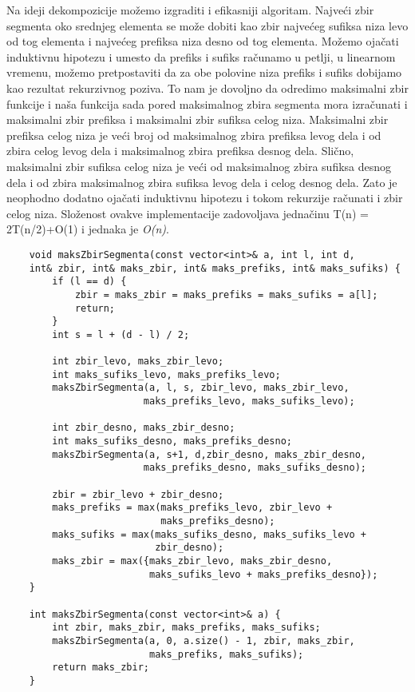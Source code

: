 \documentclass{article}
\begin{document}
Na ideji dekompozicije možemo izgraditi i efikasniji algoritam. Najveći zbir segmenta oko srednjeg elementa se može dobiti kao
zbir najvećeg sufiksa niza levo od tog elementa i najvećeg prefiksa niza desno
od tog elementa. Možemo ojačati induktivnu hipotezu i umesto da prefiks i
sufiks računamo u petlji, u linearnom vremenu, možemo pretpostaviti da za obe
polovine niza prefiks i sufiks dobijamo kao rezultat rekurzivnog poziva. To nam
je dovoljno da odredimo maksimalni zbir funkcije i naša
funkcija sada pored maksimalnog zbira segmenta mora izračunati i maksimalni
zbir prefiksa i maksimalni zbir sufiksa celog niza. Maksimalni zbir prefiksa
celog niza je veći broj od maksimalnog zbira prefiksa levog dela i od zbira celog
levog dela i maksimalnog zbira prefiksa desnog dela. Slično, maksimalni zbir
sufiksa celog niza je veći od maksimalnog zbira sufiksa desnog dela i od zbira
maksimalnog zbira sufiksa levog dela i celog desnog dela. Zato je neophodno
dodatno ojačati induktivnu hipotezu i tokom rekurzije računati i zbir celog niza. Složenost ovakve implementacije zadovoljava jednačinu 
T(n) = 2T(n/2)+O(1) i jednaka je \textit{O(n)}.
\begin{lstlisting}
    void maksZbirSegmenta(const vector<int>& a, int l, int d,
    int& zbir, int& maks_zbir, int& maks_prefiks, int& maks_sufiks) {
        if (l == d) {
            zbir = maks_zbir = maks_prefiks = maks_sufiks = a[l];
            return;
        }
        int s = l + (d - l) / 2;
       
        int zbir_levo, maks_zbir_levo; 
        int maks_sufiks_levo, maks_prefiks_levo;
        maksZbirSegmenta(a, l, s, zbir_levo, maks_zbir_levo,
                        maks_prefiks_levo, maks_sufiks_levo);
       
        int zbir_desno, maks_zbir_desno;
        int maks_sufiks_desno, maks_prefiks_desno;
        maksZbirSegmenta(a, s+1, d,zbir_desno, maks_zbir_desno,
                        maks_prefiks_desno, maks_sufiks_desno);
        
        zbir = zbir_levo + zbir_desno;
        maks_prefiks = max(maks_prefiks_levo, zbir_levo +             
                           maks_prefiks_desno);
        maks_sufiks = max(maks_sufiks_desno, maks_sufiks_levo + 
                          zbir_desno);
        maks_zbir = max({maks_zbir_levo, maks_zbir_desno, 
                         maks_sufiks_levo + maks_prefiks_desno});
    }
    
    int maksZbirSegmenta(const vector<int>& a) {
        int zbir, maks_zbir, maks_prefiks, maks_sufiks;
        maksZbirSegmenta(a, 0, a.size() - 1, zbir, maks_zbir, 
                         maks_prefiks, maks_sufiks);
        return maks_zbir;
    }
\end{lstlisting}
\end{document}
